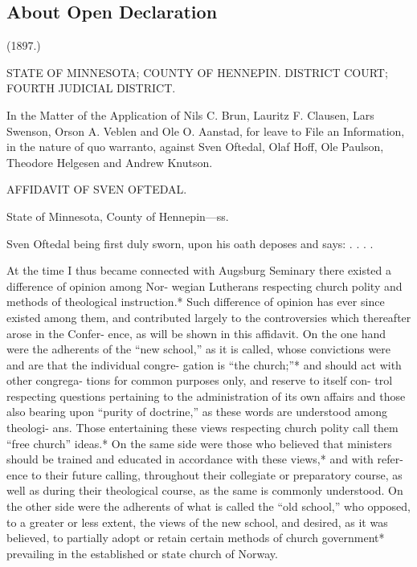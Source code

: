 
\subsection{About Open Declaration}
(1897.)

STATE OF MINNESOTA; COUNTY OF HENNEPIN.
DISTRICT COURT; FOURTH JUDICIAL DISTRICT.

In the Matter of the Application of Nils C. Brun, Lauritz
F. Clausen, Lars Swenson, Orson A. Veblen and Ole
O. Aanstad, for leave to File an Information, in the
nature of quo warranto, against Sven Oftedal, Olaf
Hoff, Ole Paulson, Theodore Helgesen and Andrew
Knutson.

AFFIDAVIT OF SVEN OFTEDAL.

State of Minnesota, County of Hennepin—ss.

Sven Oftedal being first duly sworn, upon his oath
deposes and says: . . . .

At the time I thus became connected with Augsburg
Seminary there existed a difference of opinion among Nor-
wegian Lutherans respecting church polity and methods
of theological instruction.* Such difference of opinion has
ever since existed among them, and contributed largely
to the controversies which thereafter arose in the Confer-
ence, as will be shown in this affidavit. On the one hand
were the adherents of the “new school,” as it is called,
whose convictions were and are that the individual congre-
gation is “the church;”* and should act with other congrega-
tions for common purposes only, and reserve to itself con-
trol respecting questions pertaining to the administration
of its own affairs and those also bearing upon “purity of
doctrine,” as these words are understood among theologi-
ans. Those entertaining these views respecting church
polity call them “free church” ideas.* On the same side were
those who believed that ministers should be trained and
educated in accordance with these views,* and with refer-
ence to their future calling, throughout their collegiate or
preparatory course, as well as during their theological
course, as the same is commonly understood. On the other
side were the adherents of what is called the “old school,”
who opposed, to a greater or less extent, the views of the
new school, and desired, as it was believed, to partially
adopt or retain certain methods of church government*
prevailing in the established or state church of Norway.

